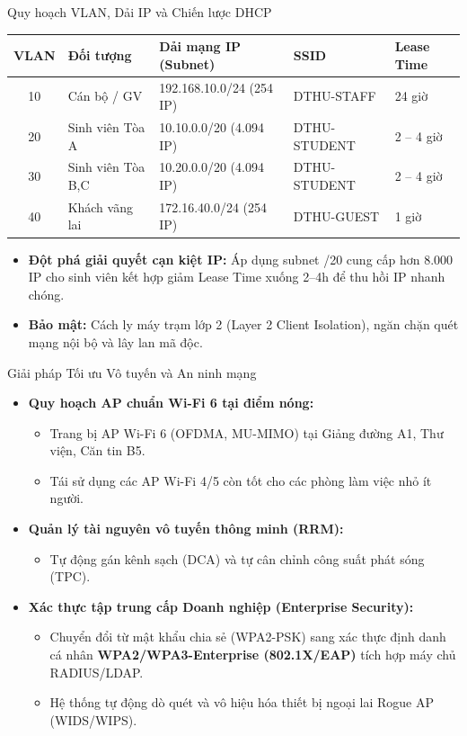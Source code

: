\documentclass[fleqn]{beamer}
\begin{document}
\begin{frame}{Quy hoạch VLAN, Dải IP và Chiến lược DHCP}
  \begin{table}\small\centering
  \begin{tabular}{cllll}
    \toprule
    \textbf{VLAN} & \textbf{Đối tượng} & \textbf{Dải mạng IP (Subnet)} & \textbf{SSID} & \textbf{Lease Time} \\
    \midrule
    10 & Cán bộ / GV & 192.168.10.0/24 (254 IP) & DTHU-STAFF & 24 giờ \\
    20 & Sinh viên Tòa A & 10.10.0.0/20 (4.094 IP) & DTHU-STUDENT & 2 -- 4 giờ \\
    30 & Sinh viên Tòa B,C & 10.20.0.0/20 (4.094 IP) & DTHU-STUDENT & 2 -- 4 giờ \\
    40 & Khách vãng lai & 172.16.40.0/24 (254 IP) & DTHU-GUEST & 1 giờ \\
    \bottomrule
  \end{tabular}
  \end{table}
  \vspace{0.2cm}
  \begin{itemize}\small
    \item \textbf{Đột phá giải quyết cạn kiệt IP:} Áp dụng subnet /20 cung cấp hơn 8.000 IP cho sinh viên kết hợp giảm Lease Time xuống 2--4h để thu hồi IP nhanh chóng.
    \item \textbf{Bảo mật:} Cách ly máy trạm lớp 2 (Layer 2 Client Isolation), ngăn chặn quét mạng nội bộ và lây lan mã độc.
  \end{itemize}
\end{frame}

\begin{frame}{Giải pháp Tối ưu Vô tuyến và An ninh mạng}
  \begin{itemize}
    \item \textbf{Quy hoạch AP chuẩn Wi-Fi 6 tại điểm nóng:}
      \begin{itemize}\small
        \item Trang bị AP Wi-Fi 6 (OFDMA, MU-MIMO) tại Giảng đường A1, Thư viện, Căn tin B5.
        \item Tái sử dụng các AP Wi-Fi 4/5 còn tốt cho các phòng làm việc nhỏ ít người.
      \end{itemize}
    \item \textbf{Quản lý tài nguyên vô tuyến thông minh (RRM):}
      \begin{itemize}\small
        \item Tự động gán kênh sạch (DCA) và tự cân chỉnh công suất phát sóng (TPC).
      \end{itemize}
    \item \textbf{Xác thực tập trung cấp Doanh nghiệp (Enterprise Security):}
      \begin{itemize}\small
        \item Chuyển đổi từ mật khẩu chia sẻ (WPA2-PSK) sang xác thực định danh cá nhân \textbf{WPA2/WPA3-Enterprise (802.1X/EAP)} tích hợp máy chủ RADIUS/LDAP.
        \item Hệ thống tự động dò quét và vô hiệu hóa thiết bị ngoại lai Rogue AP (WIDS/WIPS).
      \end{itemize}
  \end{itemize}
\end{frame}
\end{document}
